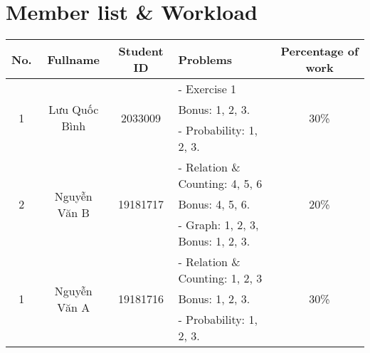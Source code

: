 \documentclass[a4paper]{article}
\begin{document}

    \newpage
    \tableofcontents
    \newpage




    \section{Member list \& Workload}

    \begin{center}
        \begin{tabular}{|c|c|c|l|c|}
            \hline
            \textbf{No.}       & \textbf{Fullname}              & \textbf{Student ID}       & \textbf{Problems}                 & \textbf{Percentage of work} \\
            \hline
            \multirow{3}{*}{1} & \multirow{3}{*}{Lưu Quốc Bình} & \multirow{3}{*}{2033009}  & - Exercise 1 & \multirow{3}{*}{30\%}\\
            &                                &                           & Bonus: 1, 2, 3.                   &                             \\
            &                                &                           & - Probability: 1, 2, 3.           &                             \\
            \hline
            \multirow{3}{*}{2} & \multirow{3}{*}{Nguyễn Văn B}  & \multirow{3}{*}{19181717} & - Relation \& Counting: 4, 5, 6& \multirow{3}{*}{20\%}\\
            &                                &                           & Bonus: 4, 5, 6.                   &                             \\
            &                                &                           & - Graph: 1, 2, 3, Bonus: 1, 2, 3. &                             \\
            \hline
            \multirow{3}{*}{1} & \multirow{3}{*}{Nguyễn Văn A}  & \multirow{3}{*}{19181716} & - Relation \& Counting: 1, 2, 3& \multirow{3}{*}{30\%}\\
            &                                &                           & Bonus: 1, 2, 3.                   &                             \\
            &                                &                           & - Probability: 1, 2, 3.           &                             \\

\end{tabular}
\end{center}
\end{document}
